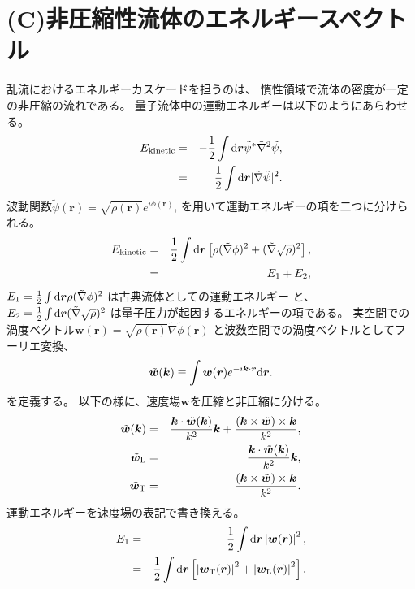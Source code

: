\documentclass[12pt,a4paper]{jbook}
\begin{document}
		\section{(C)非圧縮性流体のエネルギースペクトル}
		乱流におけるエネルギーカスケードを担うのは、
        慣性領域で流体の密度が一定の非圧縮の流れである。
		\label{s:pspectrum}
		量子流体中の運動エネルギーは以下のようにあらわせる。
		\begin{eqnarray}
			E_{{\rm kinetic}} & = & -\frac{1}{2} \int {\rm d}\bm{r} \tilde{\psi}^* \tilde{\nabla}^2 \tilde{\psi},
			\\
			& = & \frac{1}{2}\int {\rm d}\bm{r}|\tilde{\nabla} \tilde{\psi}|^2.
		\end{eqnarray}
		波動関数$\tilde{\psi}(\bm{r}) = \sqrt{\rho(\bm{r})} e^{i \phi(\bm{r})}$,
		を用いて運動エネルギーの項を二つに分けられる。
		\begin{eqnarray}
			E_{{\rm kinetic}} & = & \frac{1}{2}\int {\rm d}\bm{r}\left[
			\rho(\tilde{\nabla} \phi)^2 + (\tilde{\nabla} \sqrt{\rho})^2
			\right],
			\\
			& = & E_1 + E_2,
		\end{eqnarray}
        $E_1=\frac{1}{2}\int {\rm d}\bm{r} \rho(\tilde{\nabla} \phi)^2$
		は古典流体としての運動エネルギー
		と、
        $E_2=\frac{1}{2}\int {\rm d}\bm{r} (\tilde{\nabla} \sqrt{\rho})^2$
        は量子圧力が起因するエネルギーの項である。
		実空間での渦度ベクトル$\bm{w}(\bm{r})=\sqrt{\rho(\bm{r})}\tilde{\nabla}\tilde{\phi}(\bm{r})$
        と波数空間での渦度ベクトルとしてフーリエ変換、
		\begin{eqnarray}
			\tilde{\bm{w}}(\bm{k}) \equiv \int \bm{w}(\bm{r}) e^{-i \bm{k} \cdot \bm{r}} {\rm d} \bm{r}.
		\end{eqnarray}
        を定義する。
		以下の様に、速度場$\bm{w}$を圧縮と非圧縮に分ける。
		\begin{eqnarray}
			\tilde{\bm{w}}(\bm{k}) & = &
			\frac{\bm{k}\cdot\tilde{\bm{w}}(\bm{k})}{k^2}\bm{k}
			+ \frac{(\bm{k}\times\tilde{\bm{w}})\times\bm{k}}{k^2},
			\\
			\tilde{\bm{w}}_{\rm L} & = &
			\frac{\bm{k}\cdot\tilde{\bm{w}}(\bm{k})}{k^2}\bm{k},
			\\
			\tilde{\bm{w}}_{\rm T} & = &
			\frac{(\bm{k}\times\tilde{\bm{w}})\times\bm{k}}{k^2}.
			\end{eqnarray}
			運動エネルギーを速度場の表記で書き換える。
			\begin{eqnarray}
			E_1 & = & \frac{1}{2} \int {\rm d}\bm{r}\left|\bm{w}(\bm{r})\right|^2,
			\\
			& = & \frac{1}{2}\int {\rm d}\bm{r} \left[
				\left| \bm{w}_{{\rm T}}(\bm{r})\right|^2
				+ \left| \bm{w}_{{\rm L}}(\bm{r})\right|^2
			\right].
		\end{eqnarray}
\end{document}
